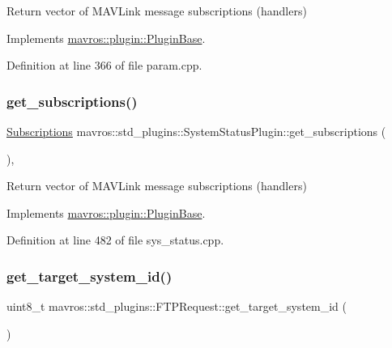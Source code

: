 Return vector of M\+A\+V\+Link message subscriptions (handlers) 



Implements \mbox{\hyperlink{group__plugin_gaf4e23fec6d7436a62cbf0942a2e5791c}{mavros\+::plugin\+::\+Plugin\+Base}}.



Definition at line 366 of file param.\+cpp.

\mbox{\label{group__plugin_gac4e5bdd397cd4f4d5a68a086879ad42e}} 
\subsubsection{\texorpdfstring{get\_subscriptions()}{get\_subscriptions()}\hspace{0.1cm}{\footnotesize\ttfamily [41/41]}}
{\footnotesize\ttfamily \mbox{\hyperlink{group__plugin_ga8967d61fc77040e0c3ea5a4585d62a09}{Subscriptions}} mavros\+::std\+\_\+plugins\+::\+System\+Status\+Plugin\+::get\+\_\+subscriptions (\begin{DoxyParamCaption}{ }\end{DoxyParamCaption})\hspace{0.3cm}{\ttfamily [inline]}, {\ttfamily [virtual]}}



Return vector of M\+A\+V\+Link message subscriptions (handlers) 



Implements \mbox{\hyperlink{group__plugin_gaf4e23fec6d7436a62cbf0942a2e5791c}{mavros\+::plugin\+::\+Plugin\+Base}}.



Definition at line 482 of file sys\+\_\+status.\+cpp.

\mbox{\label{group__plugin_ga49ae6323933afa8b164aaffccb798a0a}} 
\subsubsection{\texorpdfstring{get\_target\_system\_id()}{get\_target\_system\_id()}}
{\footnotesize\ttfamily uint8\+\_\+t mavros\+::std\+\_\+plugins\+::\+F\+T\+P\+Request\+::get\+\_\+target\+\_\+system\+\_\+id (\begin{DoxyParamCaption}{ }\end{DoxyParamCaption})\hspace{0.3cm}{\ttfamily [inline]}}




